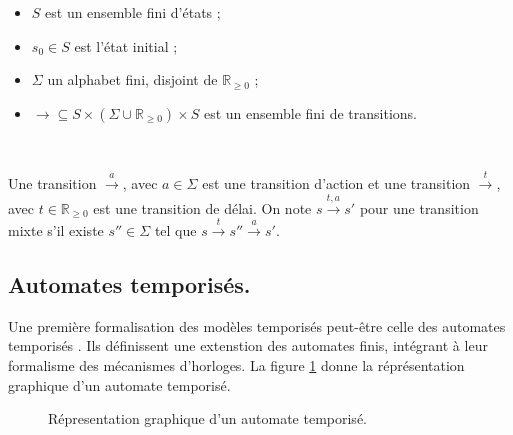       \begin{itemize}
        \item $S$ est un ensemble fini d'états ;
        \item $s_0\in S$ est l'état initial ;
        \item $\Sigma$ un alphabet fini, disjoint de $\mathbb{R}_{\geq 0}$ ;
        \item $\rightarrow \subseteq S \times (\Sigma \cup \mathbb{R}_{\geq 0})
          \times S$ est un ensemble fini de transitions.
      \end{itemize}
      
      ~
      
      Une transition $\xrightarrow{a}$, avec $a \in \Sigma$ est une transition
      d'action et une transition $\xrightarrow{t}$, avec $t \in \mathbb{R}_{\geq
        0}$ est une transition de délai. On note $s\xrightarrow{t,a}s'$ pour
      une transition mixte s'il existe $s'' \in \Sigma$ tel que
      $s\xrightarrow{t}s''\xrightarrow{a}s'$.
            
    \subsection{Automates temporisés.}
    
    
      Une première formalisation des modèles temporisés peut-être celle des
      automates temporisés \cite{alur94}. Ils définissent une extenstion des
      automates finis, intégrant à leur formalisme des mécanismes d'horloges. La
      figure \ref{fig:automate-tempo} donne la réprésentation graphique d'un
      automate temporisé.

      \begin{figure}[!ht]
        \centering \small
        \caption{Répresentation graphique d'un automate temporisé.}
        \label{fig:automate-tempo}
      \end{figure}

